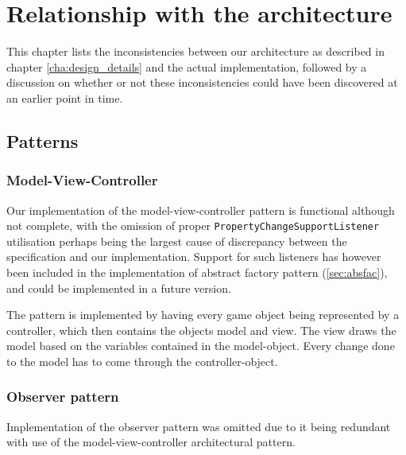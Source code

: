 \chapter{Relationship with the architecture}
\label{cha:relationship_with_the_architecture}

This chapter lists the inconsistencies between our architecture as described in chapter \ref{cha:design_details} and the actual implementation, followed by a discussion on whether or not these inconsistencies could have been discovered at an earlier point in time.



\section{Patterns}
\label{sec:patters}

\subsection{Model-View-Controller}
\label{sec:mvc}

Our implementation of the model-view-controller pattern is functional although not complete, with the omission of proper \texttt{PropertyChangeSupportListener} utilisation perhaps being the largest cause of discrepancy between the specification and our implementation.
Support for such listeners has however been included in the implementation of abstract factory pattern (\ref{sec:absfac}), and could be implemented in a future version.

The pattern is implemented by having every game object being represented by a controller, which then contains the objects model and view. The view draws the model based on the variables contained in the model-object. Every change done to the model has to come through the controller-object.




\subsection{Observer pattern}
Implementation of the observer pattern was omitted due to it being redundant with use of the model-view-controller architectural pattern.

